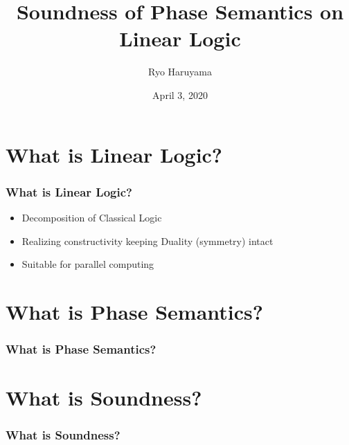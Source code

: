 \documentclass[dvipdfmx,cjk]{beamer}
\theoremstyle{example}
\begin{document}
\title[LL]{Soundness of Phase Semantics on Linear Logic} 
\author[Haruyama]{Ryo Haruyama}
\date{April 3, 2020}

\begin{frame}
  \titlepage
\end{frame}

\begin{frame}
  \tableofcontents
\end{frame}

                          \section{What is Linear Logic?}
                          
\begin{frame}
  \frametitle{What is Linear Logic?} \pause

  \begin{itemize}
    \item Decomposition of Classical Logic \pause
    \item Realizing constructivity keeping Duality (symmetry) intact \pause
    \item Suitable for parallel computing
  \end{itemize}
  
\end{frame}

                          \section{What is Phase Semantics?}
                          
\begin{frame} 
  \frametitle{What is Phase Semantics?}
  
\end{frame}

                          \section{What is Soundness?}
                          
\begin{frame}
  \frametitle{What is Soundness?}

  
\end{frame}

\end{document}
